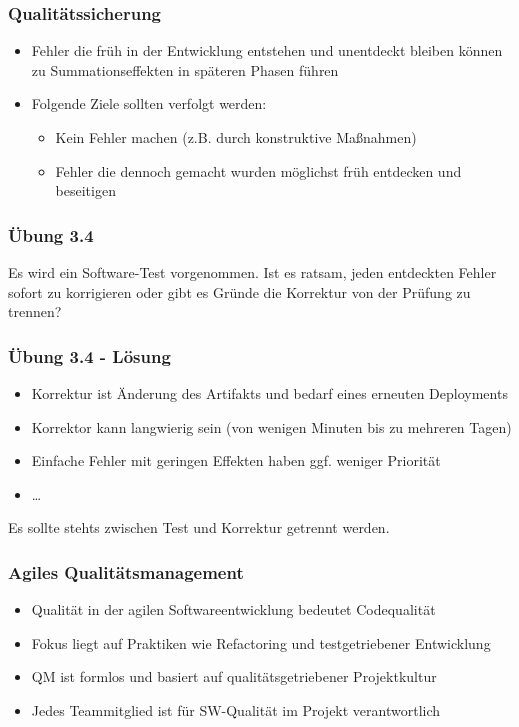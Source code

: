 \begin{frame}
\frametitle{Qualitätssicherung}
	\begin{itemize}
		\item Fehler die früh in der Entwicklung entstehen und unentdeckt bleiben können zu Summationseffekten
		in späteren Phasen führen
		\item Folgende Ziele sollten verfolgt werden:
					\begin{itemize}
						\item Kein Fehler machen (z.B. durch konstruktive Maßnahmen)
						\item Fehler die dennoch gemacht wurden möglichst früh entdecken und beseitigen
					\end{itemize}
	\end{itemize}
\end{frame}

\begin{frame}
\frametitle{Übung 3.4}
	Es wird ein Software-Test vorgenommen. Ist es ratsam, jeden entdeckten Fehler sofort zu
	korrigieren oder gibt es Gründe die Korrektur von der Prüfung zu trennen?
\end{frame}

\ifloesung
\begin{frame}
\frametitle{Übung 3.4 - Lösung}
	\begin{itemize}
		\item Korrektur ist Änderung des Artifakts und bedarf eines erneuten Deployments
		\item Korrektor kann langwierig sein (von wenigen Minuten bis zu mehreren Tagen)
		\item Einfache Fehler mit geringen Effekten haben ggf. weniger Priorität
		\item \ldots
	\end{itemize}
	Es sollte stehts zwischen Test und Korrektur getrennt werden.
\end{frame}
\fi

\begin{frame}
\frametitle{Agiles Qualitätsmanagement}
	\begin{itemize}
		\item Qualität in der agilen Softwareentwicklung bedeutet Codequalität
		\item Fokus liegt auf Praktiken wie Refactoring und testgetriebener Entwicklung
		\item QM ist formlos und basiert auf qualitätsgetriebener Projektkultur
		\item Jedes Teammitglied ist für SW-Qualität im Projekt verantwortlich
	\end{itemize}
\end{frame}

